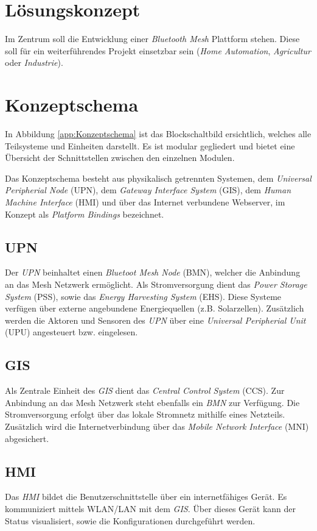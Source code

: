 \clearpage
\section{Lösungskonzept}\label{sec:Loesungskonzept}
Im Zentrum soll die Entwicklung einer \textit{Bluetooth Mesh} Plattform stehen. Diese soll für ein weiterführendes Projekt einsetzbar sein (\textit{Home Automation}, \textit{Agricultur} oder \textit{Industrie}). 

\section{Konzeptschema}\label{sec:Konzeptschema}

In Abbildung \ref{app:Konzeptschema} ist das Blockschaltbild ersichtlich, welches alle Teilsysteme und Einheiten darstellt. Es ist modular gegliedert und bietet eine Übersicht der Schnittstellen zwischen den einzelnen Modulen. 

Das Konzeptschema besteht aus physikalisch getrennten Systemen, dem \textit{Universal Peripherial Node} (UPN), dem \textit{Gateway Interface System} (GIS), dem \textit{Human Machine Interface} (HMI) und über das Internet verbundene Webserver, im Konzept als \textit{Platform Bindings} bezeichnet.

\subsection{UPN}\label{sec:Konzeptschema_UPN}  

Der \textit{UPN} beinhaltet einen \textit{Bluetoot Mesh Node} (BMN), welcher die Anbindung an das Mesh Netzwerk ermöglicht. Als Stromversorgung dient das \textit{Power Storage System} (PSS), sowie das \textit{Energy Harvesting System} (EHS). Diese Systeme verfügen über externe angebundene Energiequellen (z.B. Solarzellen). Zusätzlich werden die Aktoren und Sensoren des \textit{UPN} über eine \textit{Universal Peripherial Unit} (UPU) angesteuert bzw. eingelesen.

\subsection{GIS}\label{sec:Konzeptschema_GIS}

Als Zentrale Einheit des \textit{GIS} dient das \textit{Central Control System} (CCS). Zur Anbindung an das Mesh Netzwerk steht ebenfalls ein \textit{BMN} zur Verfügung. Die Stromversorgung erfolgt über das lokale Stromnetz mithilfe eines Netzteils. Zusätzlich wird die Internetverbindung über das \textit{Mobile Network Interface} (MNI) abgesichert. 

\subsection{HMI}\label{sec:Konzeptschema_HMI}

Das \textit{HMI} bildet die Benutzerschnittstelle über ein internetfähiges Gerät. Es kommuniziert mittels WLAN/LAN mit dem \textit{GIS}. Über dieses Gerät kann der Status visualisiert, sowie die Konfigurationen durchgeführt werden.












